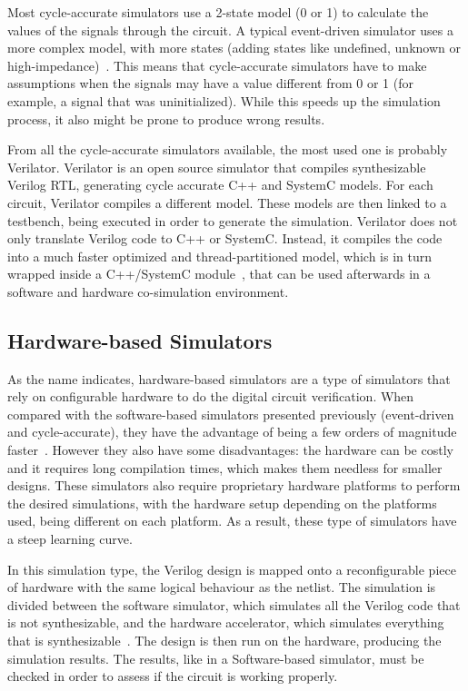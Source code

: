 \documentclass[conference]{IEEEtran}
\begin{document}
Most cycle-accurate simulators use a 2-state model (0 or 1) to calculate the
values of the signals through the circuit. A typical event-driven simulator uses
a more complex model, with more states (adding states like undefined, unknown or
high-impedance)~\cite{bennett:verilator}. This means that cycle-accurate
simulators have to make assumptions when the signals may have a value different
from 0 or 1 (for example, a signal that was uninitialized). While this speeds up
the simulation process, it also might be prone to produce wrong results.

From all the cycle-accurate simulators available, the most used one is probably
Verilator. Verilator is an open source simulator that compiles synthesizable
Verilog RTL, generating cycle accurate C++ and SystemC models. For each circuit, Verilator
compiles a different model. These models are
then linked to a testbench, being executed in order to generate the
simulation. Verilator does not only translate Verilog code to C++ or
SystemC. Instead, it compiles the code into a much faster optimized and
thread-partitioned model, which is in turn wrapped inside a C++/SystemC
module~\cite{veripool:verilator}, that can be used afterwards in a software and hardware 
co-simulation environment.

\subsection{Hardware-based Simulators}
\label{subsection:hardware}

As the name indicates, hardware-based simulators are a type of simulators that
rely on configurable hardware to do the digital circuit verification. When
compared with the software-based simulators presented previously (event-driven and 
cycle-accurate), they have the advantage of being a
few orders of magnitude faster~\cite{tan:vhstas}. However they also have some
disadvantages: the hardware can be costly and it requires long compilation times, which 
makes them needless for smaller designs. These simulators also require proprietary 
hardware platforms to perform the desired simulations, with the hardware setup depending
on the platforms used, being different on each platform. As a result, these type
of simulators have a steep learning curve.

In this simulation type, the Verilog design is mapped onto a reconfigurable
piece of hardware with the same logical behaviour as the netlist.  The simulation
is divided between the software simulator, which simulates all the Verilog code
that is not synthesizable, and the hardware accelerator, which simulates
everything that is synthesizable~\cite{khandelwal:gatelevel}. The design is then
run on the hardware, producing the simulation results. The results, like in a
Software-based simulator, must be checked in order to assess if the circuit is
working properly.
\end{document}
